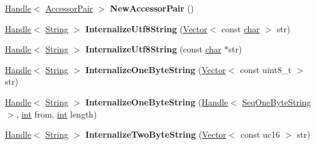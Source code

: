 \begin{DoxyCompactItemize}
\mbox{\hyperlink{classv8_1_1internal_1_1Handle}{Handle}}$<$ \mbox{\hyperlink{classv8_1_1internal_1_1AccessorPair}{Accessor\+Pair}} $>$ {\bfseries New\+Accessor\+Pair} ()
\item 
\mbox{\label{classv8_1_1internal_1_1Factory_a67758bb93032e03abf1a7917734ee068}} 
\mbox{\hyperlink{classv8_1_1internal_1_1Handle}{Handle}}$<$ \mbox{\hyperlink{classv8_1_1internal_1_1String}{String}} $>$ {\bfseries Internalize\+Utf8\+String} (\mbox{\hyperlink{classv8_1_1internal_1_1Vector}{Vector}}$<$ const \mbox{\hyperlink{classchar}{char}} $>$ str)
\item 
\mbox{\label{classv8_1_1internal_1_1Factory_adfd93314d9a0d36db0201d6b9b0832c4}} 
\mbox{\hyperlink{classv8_1_1internal_1_1Handle}{Handle}}$<$ \mbox{\hyperlink{classv8_1_1internal_1_1String}{String}} $>$ {\bfseries Internalize\+Utf8\+String} (const \mbox{\hyperlink{classchar}{char}} $\ast$str)
\item 
\mbox{\label{classv8_1_1internal_1_1Factory_a4b28bcecaf9fc12056af343ba044bd66}} 
\mbox{\hyperlink{classv8_1_1internal_1_1Handle}{Handle}}$<$ \mbox{\hyperlink{classv8_1_1internal_1_1String}{String}} $>$ {\bfseries Internalize\+One\+Byte\+String} (\mbox{\hyperlink{classv8_1_1internal_1_1Vector}{Vector}}$<$ const uint8\+\_\+t $>$ str)
\item 
\mbox{\label{classv8_1_1internal_1_1Factory_aebc9d867cc6e11a4b6d9c89bae35a8c7}} 
\mbox{\hyperlink{classv8_1_1internal_1_1Handle}{Handle}}$<$ \mbox{\hyperlink{classv8_1_1internal_1_1String}{String}} $>$ {\bfseries Internalize\+One\+Byte\+String} (\mbox{\hyperlink{classv8_1_1internal_1_1Handle}{Handle}}$<$ \mbox{\hyperlink{classv8_1_1internal_1_1SeqOneByteString}{Seq\+One\+Byte\+String}} $>$, \mbox{\hyperlink{classint}{int}} from, \mbox{\hyperlink{classint}{int}} length)
\item 
\mbox{\label{classv8_1_1internal_1_1Factory_a6b528a4e070f830ec53819b8cdb15756}} 
\mbox{\hyperlink{classv8_1_1internal_1_1Handle}{Handle}}$<$ \mbox{\hyperlink{classv8_1_1internal_1_1String}{String}} $>$ {\bfseries Internalize\+Two\+Byte\+String} (\mbox{\hyperlink{classv8_1_1internal_1_1Vector}{Vector}}$<$ const uc16 $>$ str)
\item 

\end{DoxyCompactItemize}
